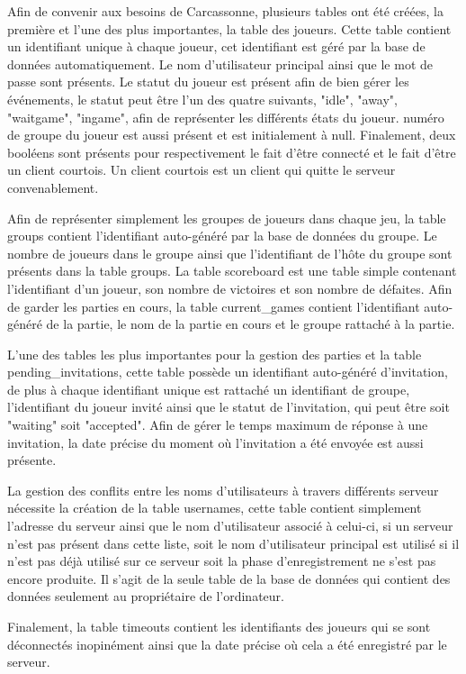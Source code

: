 \documentclass[11pt]{article}
\begin{document}
Afin de convenir aux besoins de Carcassonne, plusieurs tables ont été créées, la première et l’une des plus importantes, la table des joueurs. 
Cette table contient un identifiant unique à chaque joueur, cet identifiant est géré par la base de données automatiquement. 
Le nom d’utilisateur principal ainsi que le mot de passe sont présents. Le statut du joueur est présent afin de bien gérer les événements, le statut peut être l’un des quatre suivants, "idle", "away", "waitgame", "ingame", afin de représenter les différents états du joueur. 
numéro de groupe du joueur est aussi présent et est initialement à null. Finalement, deux booléens sont présents pour respectivement  le fait d’être connecté et le fait d’être un client courtois. 
Un client courtois est un client qui quitte le serveur convenablement.

Afin de représenter simplement les groupes de joueurs dans chaque jeu, la table groups contient l’identifiant auto-généré par la base de données du groupe. 
Le nombre de joueurs dans le groupe ainsi que l’identifiant de l’hôte du groupe sont présents dans la table groups.
La table scoreboard est une table simple contenant l’identifiant d’un joueur, son nombre de victoires et son nombre de défaites. Afin de garder les parties en cours, la table current\_games contient l’identifiant auto-généré de la partie, le nom de la partie en cours et le groupe rattaché à la partie.

L’une des tables les plus importantes pour la gestion des parties et la table pending\_invitations, cette table possède un identifiant auto-généré d’invitation, de plus à chaque identifiant unique est rattaché un identifiant de groupe, l’identifiant du joueur invité ainsi que le statut de l’invitation, qui peut être soit "waiting" soit "accepted". 
Afin de gérer le temps maximum de réponse à une invitation, la date précise du moment où l’invitation a été envoyée est aussi présente. 

La gestion des conflits entre les noms d’utilisateurs à travers différents serveur nécessite la création de la table usernames, cette table contient simplement l’adresse du serveur ainsi que le nom d’utilisateur associé à celui-ci, si un serveur n’est pas présent dans cette liste, soit le nom d’utilisateur principal est utilisé si il n’est pas déjà utilisé sur ce serveur soit la phase d’enregistrement ne s’est pas encore produite.
Il s’agit de la seule table de la base de données qui contient des données seulement au propriétaire de l’ordinateur.

Finalement, la table timeouts contient les identifiants des joueurs qui se sont déconnectés inopinément ainsi que la date précise où cela a été enregistré par le serveur.
\end{document}

